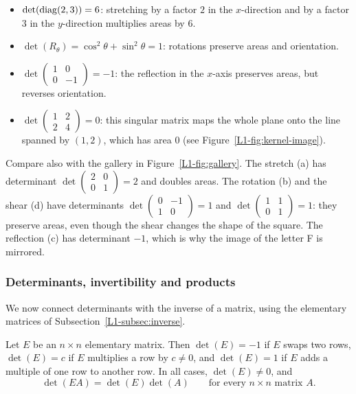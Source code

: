 \begin{example}
    \begin{itemize}
        \item $\det(\operatorname{diag}(2, 3)) = 6$: stretching by a factor $2$ in the $x$-direction and by a factor $3$ in the $y$-direction multiplies areas by $6$.
        \item $\det(R_\theta) = \cos^2\theta + \sin^2\theta = 1$: rotations preserve areas and orientation.
        \item $\det \begin{pmatrix} 1 & 0 \\ 0 & -1 \end{pmatrix} = -1$: the reflection in the $x$-axis preserves areas, but reverses orientation.
        \item $\det \begin{pmatrix} 1 & 2 \\ 2 & 4 \end{pmatrix} = 0$: this singular matrix maps the whole plane onto the line spanned by $(1, 2)$, which has area $0$ (see Figure~\ref{L1-fig:kernel-image}).
    \end{itemize}
    Compare also with the gallery in Figure~\ref{L1-fig:gallery}. The stretch (a) has determinant $\det \begin{pmatrix} 2 & 0 \\ 0 & 1 \end{pmatrix} = 2$ and doubles areas. The rotation (b) and the shear (d) have determinants $\det \begin{pmatrix} 0 & -1 \\ 1 & 0 \end{pmatrix} = 1$ and $\det \begin{pmatrix} 1 & 1 \\ 0 & 1 \end{pmatrix} = 1$: they preserve areas, even though the shear changes the shape of the square. The reflection (c) has determinant $-1$, which is why the image of the letter F is mirrored.
\end{example}

\subsubsection{Determinants, invertibility and products}

We now connect determinants with the inverse of a matrix, using the elementary matrices of Subsection~\ref{L1-subsec:inverse}.

\begin{lemma}\label{L1-lem:det-elementary}
    Let $E$ be an $n \times n$ elementary matrix. Then $\det(E) = -1$ if $E$ swaps two rows, $\det(E) = c$ if $E$ multiplies a row by $c \neq 0$, and $\det(E) = 1$ if $E$ adds a multiple of one row to another row. In all cases, $\det(E) \neq 0$, and
    \[\det(EA) = \det(E) \det(A) \qquad \text{for every } n \times n \text{ matrix } A.\]
\end{lemma}

